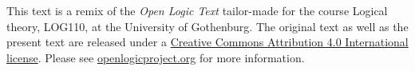 \documentclass[a4paper]{memoir}
\newcommand{\olpath}{../../}
\begin{document}







\pagestyle{ruled}

\thispagestyle{empty}%
\noindent This text is a remix of the \textit{Open Logic Text} tailor-made for the course Logical theory, LOG110, at the University of Gothenburg. The original text as well as the present text are released under a \href{http://creativecommons.org/licenses/by/4.0/}{Creative Commons
  Attribution 4.0 International license}. Please see \href{http://openlogicproject.org/}{openlogicproject.org} for
more information.
\end{document}
